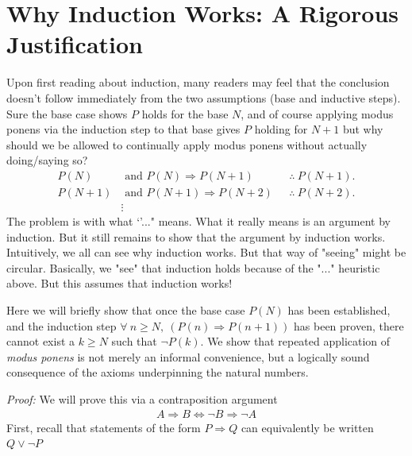 \section{Why Induction Works: A Rigorous Justification}
\label{sec:WhyInductionWorks}
Upon first reading about induction, many readers may feel that the conclusion doesn't 
follow immediately from the two assumptions (base and inductive steps). Sure the base
case shows $P$ holds for the base $N$, and of course applying modus ponens via the 
induction step to that  base gives $P$ holding for $N+1$ but why should we be allowed to 
continually apply modus ponens without actually doing/saying so?
\begin{align*} 
    P(N) &\text{ and }  P(N)\Rightarrow P(N+1) \ \ \ &\therefore \ P(N+1). \\
    P(N+1) &\text{ and }  P(N+1)\Rightarrow P(N+2) \ \ \ &\therefore \ P(N+2). \\
    &\vdots
\end{align*}
The problem is with what `'..." means. What it really means is an argument by induction. 
But it still remains to show that the argument by induction works. Intuitively, 
we all can see why induction works. But that way of "seeing" might be circular. 
Basically, we "see" that induction holds because of the "..." heuristic above. 
But this assumes that induction works!

Here we will briefly show that once the base case
$P(N)$ has been established, and the induction step 
$\forall \ n \ge N, \  (P(n) \Rightarrow P(n+1))$ has been proven, 
there cannot exist a $k \ge N$ such that $\lnot P(k)$.
We show that repeated application of \emph{modus ponens} is not merely an
informal convenience, but a logically sound consequence of the axioms
underpinning the natural numbers.

\noindent \textit{Proof:} We will prove this via a contraposition argument 
\begin{align*}
    A\Rightarrow B \iff \lnot B \Rightarrow \lnot A
\end{align*}
First, recall that statements of the form $P\Rightarrow Q$ can equivalently be written $Q\lor \lnot P$

